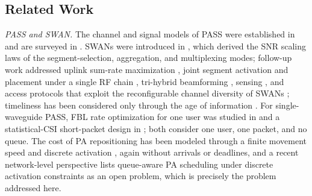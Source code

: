 \documentclass[journal]{IEEEtran}
\begin{document}
\subsection{Related Work}
\emph{PASS and SWAN.} The channel and signal models of PASS were established in \cite{Ding2025FlexibleAntenna} and are surveyed in \cite{Liu2026PASSTutorial,Liu2026PASSSurvey}. SWANs were introduced in \cite{Ouyang2026SWAN}, which derived the SNR scaling laws of the segment-selection, aggregation, and multiplexing modes; follow-up work addressed uplink sum-rate maximization \cite{Gu2026SWANSumRate}, joint segment activation and placement under a single RF chain \cite{Gu2026HSSA}, tri-hybrid beamforming \cite{Jiang2026SWANTriHybrid}, sensing \cite{Jiang2025SWANISAC}, and access protocols that exploit the reconfigurable channel diversity of SWANs \cite{Shan2026SWANAccess}; timeliness has been considered only through the age of information \cite{Zheng2026SWANPlatoon}. For single-waveguide PASS, FBL rate optimization for one user was studied in \cite{Lin2025URLLCPASS} and a statistical-CSI short-packet design in \cite{Pan2026ShortPacketPASS}; both consider one user, one packet, and no queue. The cost of PA repositioning has been modeled through a finite movement speed \cite{Wang2026Roaming} and discrete activation \cite{Jiang2026DiscreteCoupling}, again without arrivals or deadlines, and a recent network-level perspective \cite{Xu2026NetworkPerspective} lists queue-aware PA scheduling under discrete activation constraints as an open problem, which is precisely the problem addressed here.
\end{document}
